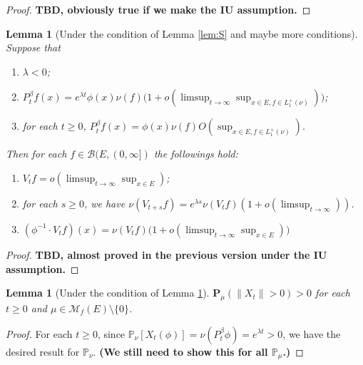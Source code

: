 \documentclass[12pt,a4paper]{amsart}
\numberwithin{equation}{section}
\theoremstyle{plain}
\newtheorem{lem}[thm]{Lemma}
\theoremstyle{definition}
\begin{document}
  \begin{proof}
    {\bf TBD, obviously true if we make the IU assumption.}
  \end{proof}

  \begin{lem}[Under the condition of Lemma \ref{lem:S} and maybe more conditions]
    \label{lem:K}
    Suppose that 
    \begin{enumerate}[label=(\alph*)]
    \item
      \label{lem:K:a}
      $\lambda < 0$;
    \item
      \label{lem:K:b}
      $P_t^\beta f(x) 
      = e^{\lambda t} \phi(x) \nu(f) \big( 1+ o(\limsup_{t\to \infty} \sup_{x\in E, f\in L_1^+(\nu)})\big)$;
    \item
      \label{lem:K:c}
      for each $t\geq 0$, $ P_t^\beta f(x) = \phi(x) \nu(f) O(\sup_{x\in E, f\in L_1^+(\nu)})$.
    \end{enumerate}
    Then for each $f\in \mathcal B(E, (0,\infty])$ the followings hold:
    \begin{enumerate}
    \item 
      \label{lem:K:1} 
      $V_tf = o(\limsup_{t\to \infty} \sup_{x\in E})$;
    \item 
      \label{lem:K:2}
      for each $s\geq 0$, we have $\nu(V_{t+s}f) = e^{\lambda s} \nu(V_tf) (1+o(\limsup_{t\to \infty}))$.
    \item 
      \label{lem:K:3}
      $ (\phi^{-1} \cdot V_tf)(x) = \nu(V_tf) \big( 1+ o(\limsup_{t\to \infty} \sup_{x\in E}) \big)$
    \end{enumerate}
  \end{lem}

  \begin{proof}
    {\bf TBD, almost proved in the previous version under the IU assumption.}
  \end{proof}
  \begin{lem}[Under the condition of Lemma \ref{lem:K}]
    \label{lem:Y:Ga}
    $\mathbf P_\mu(\|X_t\| > 0)>0$ for each $t\geq 0$ and $\mu \in \mathcal M_f(E)\setminus \{0\}$.
  \end{lem}
  \begin{proof}
    For each $t\geq 0$, since $\mathbb P_\nu[X_t(\phi)] = \nu(P_t^\beta \phi) = e^{\lambda t} > 0$, we have the desired result for $\mathbb P_\nu$.
    {\bf (We still need to show this for all $\mathbb P_\mu$.)}
  \end{proof}
\end{document}
